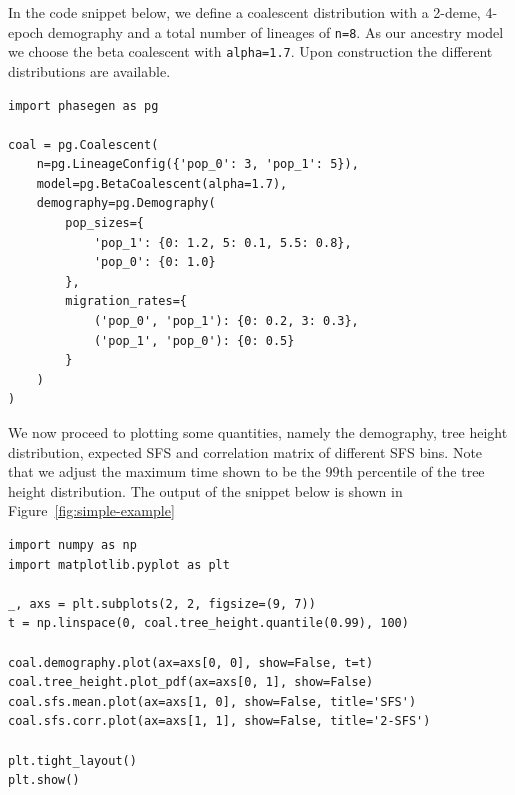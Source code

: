 \documentclass[hidelinks,11pt]{article}
\begin{document}
    In the code snippet below, we define a coalescent distribution with a 2-deme, 4-epoch demography and a total number of lineages of \texttt{n=8}.
    As our ancestry model we choose the beta coalescent with \texttt{alpha=1.7}.
    Upon construction the different distributions are available.
    \begin{verbatim}
import phasegen as pg

coal = pg.Coalescent(
    n=pg.LineageConfig({'pop_0': 3, 'pop_1': 5}),
    model=pg.BetaCoalescent(alpha=1.7),
    demography=pg.Demography(
        pop_sizes={
            'pop_1': {0: 1.2, 5: 0.1, 5.5: 0.8},
            'pop_0': {0: 1.0}
        },
        migration_rates={
            ('pop_0', 'pop_1'): {0: 0.2, 3: 0.3},
            ('pop_1', 'pop_0'): {0: 0.5}
        }
    )
)

    \end{verbatim}

    We now proceed to plotting some quantities, namely the demography, tree height distribution, expected SFS and correlation matrix of different SFS bins.
    Note that we adjust the maximum time shown to be the 99th percentile of the tree height distribution.
    The output of the snippet below is shown in Figure~\ref{fig:simple-example}
    \begin{verbatim}
import numpy as np
import matplotlib.pyplot as plt

_, axs = plt.subplots(2, 2, figsize=(9, 7))
t = np.linspace(0, coal.tree_height.quantile(0.99), 100)

coal.demography.plot(ax=axs[0, 0], show=False, t=t)
coal.tree_height.plot_pdf(ax=axs[0, 1], show=False)
coal.sfs.mean.plot(ax=axs[1, 0], show=False, title='SFS')
coal.sfs.corr.plot(ax=axs[1, 1], show=False, title='2-SFS')

plt.tight_layout()
plt.show()
    \end{verbatim}
\end{document}
